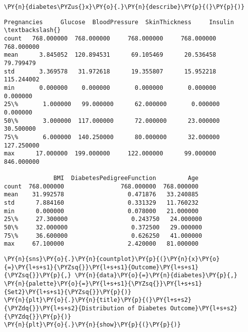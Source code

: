     \begin{tcolorbox}[breakable, size=fbox, boxrule=1pt, pad at break*=1mm,colback=cellbackground, colframe=cellborder]
\begin{Verbatim}[commandchars=\\\{\}]
\PY{n}{diabetes\PYZus{}x}\PY{o}{.}\PY{n}{describe}\PY{p}{(}\PY{p}{)}
\end{Verbatim}
\end{tcolorbox}

            \begin{tcolorbox}[breakable, size=fbox, boxrule=.5pt, pad at break*=1mm, opacityfill=0]
\begin{Verbatim}[commandchars=\\\{\}]
       Pregnancies     Glucose  BloodPressure  SkinThickness     Insulin  \textbackslash{}
count   768.000000  768.000000     768.000000     768.000000  768.000000
mean      3.845052  120.894531      69.105469      20.536458   79.799479
std       3.369578   31.972618      19.355807      15.952218  115.244002
min       0.000000    0.000000       0.000000       0.000000    0.000000
25\%       1.000000   99.000000      62.000000       0.000000    0.000000
50\%       3.000000  117.000000      72.000000      23.000000   30.500000
75\%       6.000000  140.250000      80.000000      32.000000  127.250000
max      17.000000  199.000000     122.000000      99.000000  846.000000

              BMI  DiabetesPedigreeFunction         Age
count  768.000000                768.000000  768.000000
mean    31.992578                  0.471876   33.240885
std      7.884160                  0.331329   11.760232
min      0.000000                  0.078000   21.000000
25\%     27.300000                  0.243750   24.000000
50\%     32.000000                  0.372500   29.000000
75\%     36.600000                  0.626250   41.000000
max     67.100000                  2.420000   81.000000
\end{Verbatim}
\end{tcolorbox}
        
    \begin{tcolorbox}[breakable, size=fbox, boxrule=1pt, pad at break*=1mm,colback=cellbackground, colframe=cellborder]
\begin{Verbatim}[commandchars=\\\{\}]
\PY{n}{sns}\PY{o}{.}\PY{n}{countplot}\PY{p}{(}\PY{n}{x}\PY{o}{=}\PY{l+s+s1}{\PYZsq{}}\PY{l+s+s1}{Outcome}\PY{l+s+s1}{\PYZsq{}}\PY{p}{,} \PY{n}{data}\PY{o}{=}\PY{n}{diabetes}\PY{p}{,} \PY{n}{palette}\PY{o}{=}\PY{l+s+s1}{\PYZsq{}}\PY{l+s+s1}{Set2}\PY{l+s+s1}{\PYZsq{}}\PY{p}{)}
\PY{n}{plt}\PY{o}{.}\PY{n}{title}\PY{p}{(}\PY{l+s+s2}{\PYZdq{}}\PY{l+s+s2}{Distribution of Diabetes Outcome}\PY{l+s+s2}{\PYZdq{}}\PY{p}{)}
\PY{n}{plt}\PY{o}{.}\PY{n}{show}\PY{p}{(}\PY{p}{)}
\end{Verbatim}
\end{tcolorbox}

